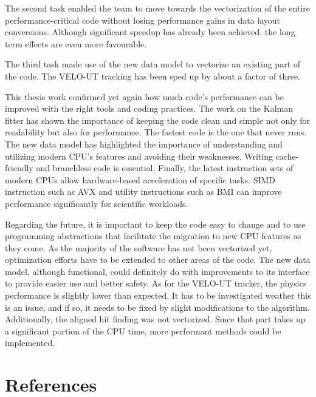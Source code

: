 \documentclass[12pt]{article}
\begin{document}
The second task enabled the team to move towards the vectorization of the entire performance-critical code without losing performance gains in data layout conversions. Although significant speedup has already been achieved, the long term effects are even more favourable.

The third task made use of the new data model to vectorize an existing part of the code. The VELO-UT tracking has been sped up by about a factor of three.
\vspace{1pc}

This thesis work confirmed yet again how much code's performance can be improved with the right tools and coding practices. The work on the Kalman fitter has shown the importance of keeping the code clean and simple not only for readability but also for performance. The fastest code is the one that never runs. The new data model has highlighted the importance of understanding and utilizing modern CPU's features and avoiding their weaknesses. Writing cache-friendly and branchless code is essential. Finally, the latest instruction sets of modern CPUs allow hardware-based acceleration of specific tasks. SIMD instruction such as AVX and utility instructions such as BMI can improve performance significantly for scientific workloads.
\vspace{1pc}

Regarding the future, it is important to keep the code easy to change and to use programming abstractions that facilitate the migration to new CPU features as they come. As the majority of the software has not been vectorized yet, optimization efforts have to be extended to other areas of the code. The new data model, although functional, could definitely do with improvements to its interface to provide easier use and better safety.
As for the VELO-UT tracker, the physics performance is slightly lower than expected. It has to be investigated weather this is an issue, and if so, it needs to be fixed by slight modifications to the algorithm. Additionally, the aligned hit finding was not vectorized. Since that part takes up a significant portion of the CPU time, more performant methods could be implemented.



\newpage
\section{References}
\end{document}
